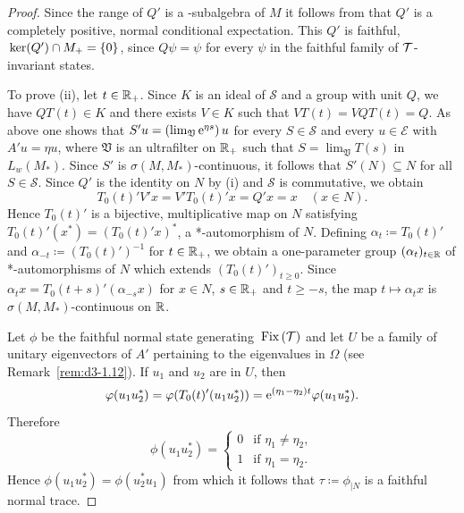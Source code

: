 \begin{proof}
Since the range of\/ $Q'$ is a \WA-subalgebra of\/ $M$ it follows from \textcite[Theorem III.3.4]{takesaki:1979} that $Q'$ is a completely positive, normal conditional expectation.
This $Q'$ is faithful, \ie $\mathop{}\mathrm{ker}(Q') \cap M_{+} = \{0\}$, since $Q\psi = \psi$ for every $\psi$ in the faithful family of\/ $\mathcal{T}$-invariant states.

To prove (ii), let $t \in \mathbb{R}_{+}$.
Since $K$ is an ideal of\/ $\mathcal{S}$ and a group with unit $Q$, we have $QT(t) \in K$ and there exists $V \in K$ such that $VT(t) = VQT(t) = Q$.
As above one shows that $S'u = (\lim_{\mathfrak{V}} \mathrm{e}^{\eta s})\,u$ for every $S \in \mathcal{S}$ and every $u \in \mathcal{E}$ with $A'u = \eta u$, where $\mathfrak{V}$ is an ultrafilter on $\mathbb{R}_{+}$ such that $S = \lim_{\mathfrak{V}} T(s)$ in $L_{w}(M_{*})$.
Since $S'$ is $\sigma(M,M_{*})$-continuous, it follows that $S'(N) \subseteq N$ for all $S \in \mathcal{S}$.
Since $Q'$ is the identity on $N$ by (i) and $\mathcal{S}$ is commutative, we obtain
\[
T_{0}(t)'V'x = V'T_{0}(t)'x = Q'x = x \quad (x \in N) .
\]
Hence $T_{0}(t)'$ is a bijective, multiplicative map on $N$ satisfying $T_{0}(t)'(x^{*}) = (T_{0}(t)'x)^{*}$, \ie a *-automorphism of\/ $N$.
Defining $\alpha_{t} \coloneq T_{0}(t)'$ and $\alpha_{-t} \coloneq (T_{0}(t)')^{-1}$ for $t \in \mathbb{R}_{+}$, we obtain a one-parameter group $(\alpha_{t})_{t \in \mathbb{R}}$ of *-automorphisms of\/ $N$ which extends $(T_{0}(t)')_{t \geq 0}$.
Since $\alpha_{t}x = T_{0}(t+s)'(\alpha_{-s}x)$ for $x \in N$, $s \in \mathbb{R}_{+}$ and $t \geq -s$, the map $t \mapsto \alpha_{t}x$ is $\sigma(M,M_{*})$-continuous on $\mathbb{R}$.

Let $\phi$ be the faithful normal state generating $\mathop{}\mathrm{Fix}\left(\mathcal{T}\right)$ and let $U$ be a family of unitary eigenvectors of\/ $A'$ pertaining to the eigenvalues in $\Omega$ (see Remark~\ref{rem:d3-1.12}).
If\/ $u_{1}$ and $u_{2}$ are in $U$, then
\[
\phi(u_{1}u_{2}^{*}) = \phi(T_{0}(t)'(u_{1}u_{2}^{*})) = \eu^{(\eta_{1}-\eta_{2})t}\phi(u_{1}u_{2}^{*}).
\]
Therefore
\[
\phi(u_{1}u_{2}^{*}) = 
    \begin{cases} 
        0 & \text{if } \eta_{1} \neq \eta_{2}, \\ 
        1 & \text{if } \eta_{1} = \eta_{2}. 
    \end{cases}
\]
Hence $\phi(u_{1}u_{2}^{*}) = \phi(u_{2}^{*}u_{1})$ from which it follows that $\tau \coloneqq \phi_{\vert N}$ is a faithful normal trace.
\end{proof}
